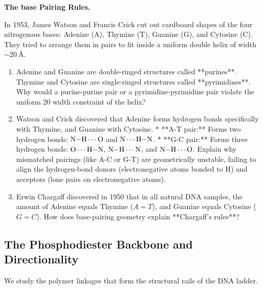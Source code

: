 \documentclass[12pt, a4paper]{book}
\begin{document}
\begin{puzzlebox}
\textbf{The base Pairing Rules.}

In 1953, James Watson and Francis Crick cut out cardboard shapes of the four nitrogenous bases: Adenine (A), Thymine (T), Guanine (G), and Cytosine (C). They tried to arrange them in pairs to fit inside a uniform double helix of width $\sim \SI{20}{\text{\AA}}$.
\begin{enumerate}[label=(\alph*), leftmargin=*]
  \item Adenine and Guanine are double-ringed structures called **purines**. Thymine and Cytosine are single-ringed structures called **pyrimidines**.
        Why would a purine-purine pair or a pyrimidine-pyrimidine pair violate the uniform \SI{20}{\text{\AA}} width constraint of the helix?
  \item Watson and Crick discovered that Adenine forms hydrogen bonds specifically with Thymine, and Guanine with Cytosine.
        * **A-T pair:** Forms two hydrogen bonds: $\ce{N-H\cdots O}$ and $\ce{N\cdots H-N}$.
        * **G-C pair:** Forms three hydrogen bonds: $\ce{O\cdots H-N}$, $\ce{N-H\cdots N}$, and $\ce{N-H\cdots O}$.
        Explain why mismatched pairings (like A-C or G-T) are geometrically unstable, failing to align the hydrogen-bond donors (electronegative atoms bonded to H) and acceptors (lone pairs on electronegative atoms).
  \item Erwin Chargaff discovered in 1950 that in all natural DNA samples, the amount of Adenine equals Thymine ($A=T$), and Guanine equals Cytosine ($G=C$). How does base-pairing geometry explain **Chargaff's rules**?
\end{enumerate}
\end{puzzlebox}

\subsection{The Phosphodiester Backbone and Directionality}

We study the polymer linkages that form the structural rails of the DNA ladder.
\end{document}
